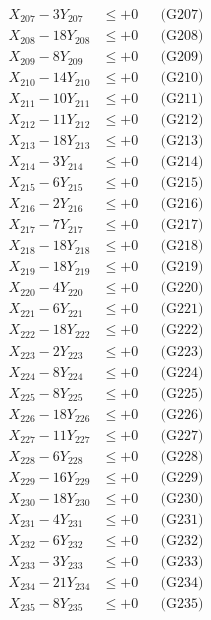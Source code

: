 \documentclass[a4paper,10pt]{article}
\begin{document}
{\begin{align}
X_{207} - 3Y_{207} &\leq +0 && \text{(G207)} \\
X_{208} - 18Y_{208} &\leq +0 && \text{(G208)} \\
X_{209} - 8Y_{209} &\leq +0 && \text{(G209)} \\
X_{210} - 14Y_{210} &\leq +0 && \text{(G210)} \\
X_{211} - 10Y_{211} &\leq +0 && \text{(G211)} \\
X_{212} - 11Y_{212} &\leq +0 && \text{(G212)} \\
X_{213} - 18Y_{213} &\leq +0 && \text{(G213)} \\
\allowbreak
X_{214} - 3Y_{214} &\leq +0 && \text{(G214)} \\
X_{215} - 6Y_{215} &\leq +0 && \text{(G215)} \\
X_{216} - 2Y_{216} &\leq +0 && \text{(G216)} \\
X_{217} - 7Y_{217} &\leq +0 && \text{(G217)} \\
X_{218} - 18Y_{218} &\leq +0 && \text{(G218)} \\
X_{219} - 18Y_{219} &\leq +0 && \text{(G219)} \\
X_{220} - 4Y_{220} &\leq +0 && \text{(G220)} \\
X_{221} - 6Y_{221} &\leq +0 && \text{(G221)} \\
X_{222} - 18Y_{222} &\leq +0 && \text{(G222)} \\
X_{223} - 2Y_{223} &\leq +0 && \text{(G223)} \\
\allowbreak
X_{224} - 8Y_{224} &\leq +0 && \text{(G224)} \\
X_{225} - 8Y_{225} &\leq +0 && \text{(G225)} \\
X_{226} - 18Y_{226} &\leq +0 && \text{(G226)} \\
X_{227} - 11Y_{227} &\leq +0 && \text{(G227)} \\
X_{228} - 6Y_{228} &\leq +0 && \text{(G228)} \\
X_{229} - 16Y_{229} &\leq +0 && \text{(G229)} \\
X_{230} - 18Y_{230} &\leq +0 && \text{(G230)} \\
X_{231} - 4Y_{231} &\leq +0 && \text{(G231)} \\
X_{232} - 6Y_{232} &\leq +0 && \text{(G232)} \\
X_{233} - 3Y_{233} &\leq +0 && \text{(G233)} \\
\allowbreak
X_{234} - 21Y_{234} &\leq +0 && \text{(G234)} \\
X_{235} - 8Y_{235} &\leq +0 && \text{(G235)} \\

\end{align}}
\end{document}
